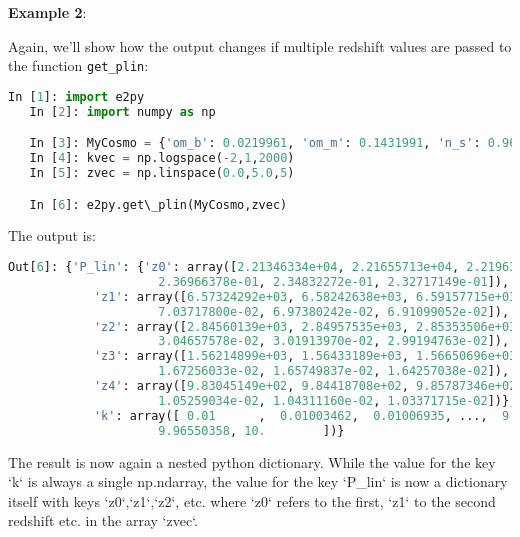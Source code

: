 \documentclass[american,11pt]{article}
\def\code#1{\texttt{#1}}
\begin{document}
\textbf{Example 2}:

Again, we'll show how the output changes if multiple redshift values are passed to the function  \code{get\_plin}:
\begin{lstlisting}[language=python]
   In [1]: import e2py
   In [2]: import numpy as np

   In [3]: MyCosmo = {'om_b': 0.0219961, 'om_m': 0.1431991, 'n_s': 0.96, 'h': 0.67, 'w_0': -1.0, 'sigma_8': 0.83}
   In [4]: kvec = np.logspace(-2,1,2000)
   In [5]: zvec = np.linspace(0.0,5.0,5)

   In [6]: e2py.get\_plin(MyCosmo,zvec)
\end{lstlisting}
The output is:
\begin{lstlisting}[language=python]
   Out[6]: {'P_lin': {'z0': array([2.21346334e+04, 2.21655713e+04, 2.21963998e+04, ...,
                     2.36966378e-01, 2.34832272e-01, 2.32717149e-01]),
            'z1': array([6.57324292e+03, 6.58242638e+03, 6.59157715e+03, ...,
                     7.03717800e-02, 6.97380242e-02, 6.91099052e-02]),
            'z2': array([2.84560139e+03, 2.84957535e+03, 2.85353506e+03, ...,
                     3.04657578e-02, 3.01913970e-02, 2.99194763e-02]),
            'z3': array([1.56214899e+03, 1.56433189e+03, 1.56650696e+03, ...,
                     1.67256033e-02, 1.65749837e-02, 1.64257038e-02]),
            'z4': array([9.83045149e+02, 9.84418708e+02, 9.85787346e+02, ...,
                     1.05259034e-02, 1.04311160e-02, 1.03371715e-02])},
            'k': array([ 0.01      ,  0.01003462,  0.01006935, ...,  9.93112617,
                     9.96550358, 10.        ])}
\end{lstlisting}
The result is now again a nested python dictionary. While the value for the key `k` is always a single np.ndarray, the value for the key `P\_lin` is now a dictionary itself with keys `z0`,`z1`,`z2`, etc. where `z0` refers to the first, `z1` to the second redshift etc. in the array `zvec`.
\end{document}
